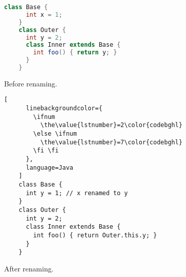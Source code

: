 \centering
\begin{subfigure}[t]{0.48\columnwidth}
  \begin{lstlisting}[language=Java]
    class Base {
      int x = 1;
    }
    class Outer {
      int y = 2;
      class Inner extends Base {
        int foo() { return y; }
      }
    }
  \end{lstlisting}%
  \caption{Before renaming.}%
  \label{fig:java-rename-example-before}
\end{subfigure}%
\hspace{1em}%
\begin{subfigure}[t]{0.48\columnwidth}
  \begin{lstlisting}[
      linebackgroundcolor={
        \ifnum
          \the\value{lstnumber}=2\color{codebghl}
        \else \ifnum
          \the\value{lstnumber}=7\color{codebghl}
        \fi \fi
      },
      language=Java
    ]
    class Base {
      int y = 1; // x renamed to y
    }
    class Outer {
      int y = 2;
      class Inner extends Base {
        int foo() { return Outer.this.y; }
      }
    }
  \end{lstlisting}%
  \caption{After renaming.}%
  \label{fig:java-rename-example-after}
\end{subfigure}%